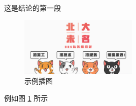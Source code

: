 
这是结论的第一段
\par



\begin{figure}[htbp!]
    \centering
    \includegraphics[width = 0.5\textwidth,natwidth=610,natheight=642]{chap/index_MKoueo.jpg}
    \caption{示例插图}\label{fig:example}
\end{figure}

\par
例如图 \ref{fig:example} 所示

